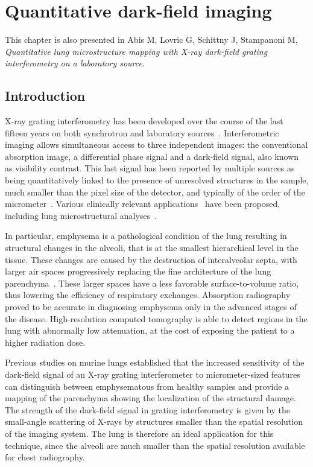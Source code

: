 \chapter{Quantitative dark-field imaging}\label{ch:lung-dark-field}
This chapter is also presented in Abis M, Lovric G, Schittny J, Stampanoni
M, \emph{Quantitative lung microstructure mapping with X-ray dark-field grating interferometry on a laboratory source}.
\section{Introduction}\label{sec:introduction}
X-ray grating interferometry has been developed over the course of the last
  fifteen years on both synchrotron and laboratory
sources~\cite{David_2002,1347-4065-42-7B-L866,Weitkamp_2005,1347-4065-45-6R-5254,Pfeiffer2006}.
Interferometric imaging allows simultaneous access to three independent
images: the conventional absorption image, a differential phase signal and a
dark-field signal, also known as visibility contrast. This last signal has
been reported by multiple sources as being quantitatively linked to the
presence of unresolved structures in the sample, much smaller than the pixel
size of the detector, and typically of the order of the
micrometer~\cite{Pfeiffer2008,Lynch:11,Yashiro:10}. Various clinically
relevant applications~\cite{Wen_2009,Thilo2013} have been
proposed, including lung microstructural analyses~\cite{Schleede17880,Meinel_2014,Meinel_2013,Yaroshenko_2013}.

In particular, emphysema is a pathological condition of the lung
resulting in structural changes in the alveoli, that is at the smallest
hierarchical level in the tissue. These changes are caused by the
destruction of interalveolar septa, with larger air spaces progressively
replacing the fine architecture of the lung
parenchyma~\cite{Sharafkhaneh_2008}. These larger spaces have a less
favorable surface-to-volume ratio, thus lowering the efficiency
of respiratory exchanges. Absorption radiography proved to be accurate in
diagnosing emphysema only in the advanced stages of the disease. 
High-resolution computed tomography is able to detect regions in the lung
with abnormally low attenuation, at the cost of exposing the patient
to a higher radiation dose.

Previous studies on murine lungs established that the increased sensitivity of
the dark-field signal of an X-ray grating interferometer to micrometer-sized
features can distinguish between emphysematous from healthy samples and
provide a mapping of the parenchyma showing the localization of the
structural damage.
The strength of the dark-field signal in grating interferometry is
given by the small-angle scattering of X-rays by structures smaller than the
spatial resolution of the imaging system. The lung is therefore an ideal
application for this technique, since the alveoli are much
smaller than the spatial resolution available for chest radiography.

